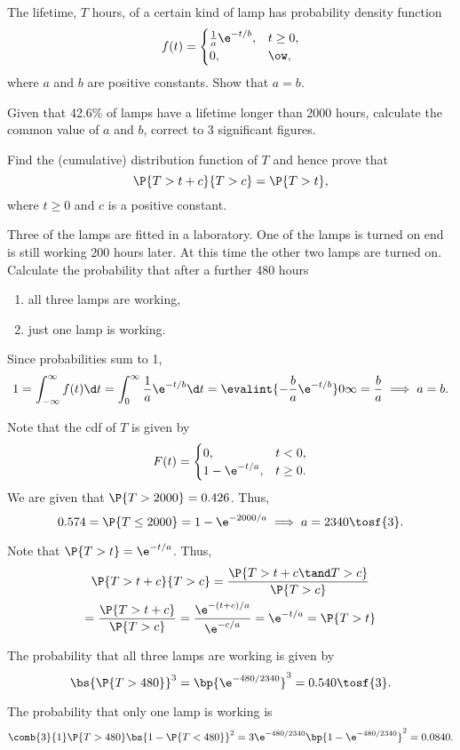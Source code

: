 \begin{problem}
    The lifetime, $T$ hours, of a certain kind of lamp has probability density function \[f(t) = \begin{cases}
        \frac1a \e^{-t/b}, & t \geq 0,\\
        0, & \ow,
    \end{cases}\] where $a$ and $b$ are positive constants. Show that $a = b$.
    
    Given that 42.6\% of lamps have a lifetime longer than 2000 hours, calculate the common value of $a$ and $b$, correct to 3 significant figures.

    Find the (cumulative) distribution function of $T$ and hence prove that \[\P{T > t + c}{T > c} = \P{T > t},\] where $t \geq 0$ and $c$ is a positive constant.
    
    Three of the lamps are fitted in a laboratory. One of the lamps is turned on end is still working 200 hours later. At this time the other two lamps are turned on. Calculate the probability that after a further 480 hours
    \begin{enumerate}
        \item all three lamps are working,
        \item just one lamp is working.
    \end{enumerate}
\end{problem}
\begin{solution}
    Since probabilities sum to 1, \[1 = \int_{-\infty}^\infty f(t) \d t = \int_0^\infty \frac1a \e^{-t/b} \d t = \evalint{-\frac{b}{a} \e^{-t/b}}0\infty = \frac{b}{a} \implies a = b.\]

    Note that the cdf of $T$ is given by \[F(t) = \begin{cases}
        0, & t < 0,\\
        1 - \e^{-t/a}, & t \geq 0.
    \end{cases}\] We are given that $\P{T > 2000} = 0.426$. Thus, \[0.574 = \P{T \leq 2000} = 1 - \e^{-2000/a} \implies a = 2340 \tosf{3}.\]

    Note that $\P{T > t} = \e^{-t/a}$. Thus,
    \begin{gather*}
        \P{T > t + c}{T > c} = \frac{\P{T > t + c \tand T > c}}{\P{T > c}}\\
        = \frac{\P{T > t + c}}{\P{T > c}} = \frac{\e^{-(t + c)/a}}{\e^{-c/a}} = \e^{-t/a} = \P{T > t}
    \end{gather*}

    \begin{ppart}
        The probability that all three lamps are working is given by \[\bs{\P{T > 480}}^3 = \bp{\e^{-480/2340}}^3 = 0.540 \tosf{3}.\]
    \end{ppart}
    \begin{ppart}
        The probability that only one lamp is working is \[\comb{3}{1} \P{T > 480} \bs{1 - \P{T < 480}}^2 = 3 \e^{-480/2340} \bp{1 - \e^{-480/2340}}^2 = 0.0840.\]
    \end{ppart}
\end{solution}

